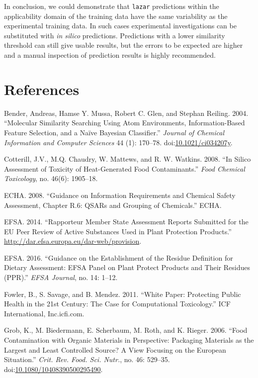 \documentclass[]{achemso}
\begin{document}
In conclusion, we could demonstrate that \texttt{lazar} predictions
within the applicability domain of the training data have the same
variability as the experimental training data. In such cases
experimental investigations can be substituted with \emph{in silico}
predictions. Predictions with a lower similarity threshold can still
give usable results, but the errors to be expected are higher and a
manual inspection of prediction results is highly recommended.

\section*{References}\label{references}

\hypertarget{refs}{}
\hypertarget{ref-doi:10.1021ux2fci034207y}{}
Bender, Andreas, Hamse Y. Mussa, Robert C. Glen, and Stephan Reiling.
2004. ``Molecular Similarity Searching Using Atom Environments,
Information-Based Feature Selection, and a Naïve Bayesian Classifier.''
\emph{Journal of Chemical Information and Computer Sciences} 44 (1):
170--78.
doi:\href{https://doi.org/10.1021/ci034207y}{10.1021/ci034207y}.

\hypertarget{ref-Cotterill2008}{}
Cotterill, J.V., M.Q. Chaudry, W. Mattews, and R. W. Watkins. 2008. ``In
Silico Assessment of Toxicity of Heat-Generated Food Contaminants.''
\emph{Food Chemical Toxicology}, no. 46(6): 1905--18.

\hypertarget{ref-ECHA2008}{}
ECHA. 2008. ``Guidance on Information Requirements and Chemical Safety
Assessment, Chapter R.6: QSARs and Grouping of Chemicals.'' ECHA.

\hypertarget{ref-EFSA2014}{}
EFSA. 2014. ``Rapporteur Member State Assessment Reports Submitted for
the EU Peer Review of Active Substances Used in Plant Protection
Products.'' \url{http://dar.efsa.europa.eu/dar-web/provision}.

\hypertarget{ref-EFSA2016}{}
EFSA. 2016. ``Guidance on the Establishment of the Residue Definition
for Dietary Assessment: EFSA Panel on Plant Protect Products and Their
Residues (PPR).'' \emph{EFSA Journal}, no. 14: 1--12.

\hypertarget{ref-Fowler2011}{}
Fowler, B., S. Savage, and B. Mendez. 2011. ``White Paper: Protecting
Public Health in the 21st Century: The Case for Computational
Toxicology.'' ICF International, Inc.icfi.com.

\hypertarget{ref-Grob2006}{}
Grob, K., M. Biedermann, E. Scherbaum, M. Roth, and K. Rieger. 2006.
``Food Contamination with Organic Materials in Perspective: Packaging
Materials as the Largest and Least Controlled Source? A View Focusing on
the European Situation.'' \emph{Crit. Rev. Food. Sci. Nutr.}, no. 46:
529--35.
doi:\href{https://doi.org/10.1080/10408390500295490}{10.1080/10408390500295490}.
\end{document}
